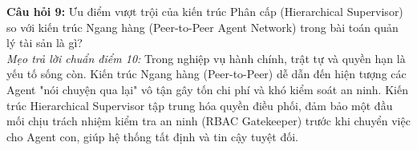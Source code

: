 \begin{checkpointbox}
\textbf{Câu hỏi 9:} Ưu điểm vượt trội của kiến trúc Phân cấp (Hierarchical Supervisor) so với kiến trúc Ngang hàng (Peer-to-Peer Agent Network) trong bài toán quản lý tài sản là gì?\\
\textit{Mẹo trả lời chuẩn điểm 10:} Trong nghiệp vụ hành chính, trật tự và quyền hạn là yếu tố sống còn. Kiến trúc Ngang hàng (Peer-to-Peer) dễ dẫn đến hiện tượng các Agent "nói chuyện qua lại" vô tận gây tốn chi phí và khó kiểm soát an ninh. Kiến trúc Hierarchical Supervisor tập trung hóa quyền điều phối, đảm bảo một đầu mối chịu trách nhiệm kiểm tra an ninh (RBAC Gatekeeper) trước khi chuyển việc cho Agent con, giúp hệ thống tất định và tin cậy tuyệt đối.
\end{checkpointbox}


